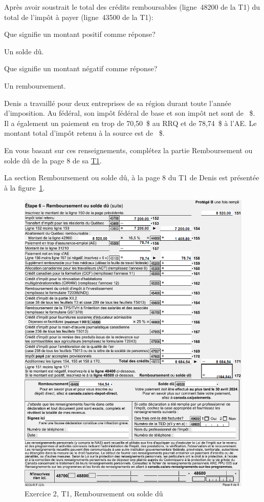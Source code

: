 \begin{question}
	Après avoir soustrait le total des crédits remboursables (ligne~48200 de la T1) du total de l'impôt à payer (ligne~43500 de la T1):
\end{question}
\setcounter{sousQuestion}{0}
\begin{sousQuestion}
	Que signifie un montant positif comme réponse?
\end{sousQuestion}
Un solde dû.

\begin{sousQuestion}
	Que signifie un montant négatif comme réponse?
\end{sousQuestion}
Un remboursement.

\begin{question}
	Denis a travaillé pour deux entreprises de sa région durant toute l'année d'imposition. Au fédéral, son impôt fédéral de base et son impôt net sont de ~\$. Il a également un paiement en trop de 70,50~\$ au RRQ et de 78,74~\$ à l'AE. Le montant total d'impôt retenu à la source est de ~\$. 
	
	En vous basant sur ces renseignements, complétez la partie \og Remboursement ou solde dû \fg{} de la page 8 de sa \href{https://www.canada.ca/fr/agence-revenu/services/formulaires-publications/trousses-impot-toutes-annees-imposition/trousse-generale-impot-prestations/quebec/5005-r.html}{T1}.
\end{question}
La section \og Remboursement ou solde dû\fg{}, à la page 8 du T1 de Denis est présentée à la figure~\ref{fig:chap5Exercice2Q3}.
\begin{figure}
	\centering
	\includegraphics[width=.9\textwidth]{exercice/5-2/Q3/T1-6.png}
	\caption[]{Exercice 2, T1, Remboursement ou solde dû}
	\label{fig:chap5Exercice2Q3}
\end{figure}

